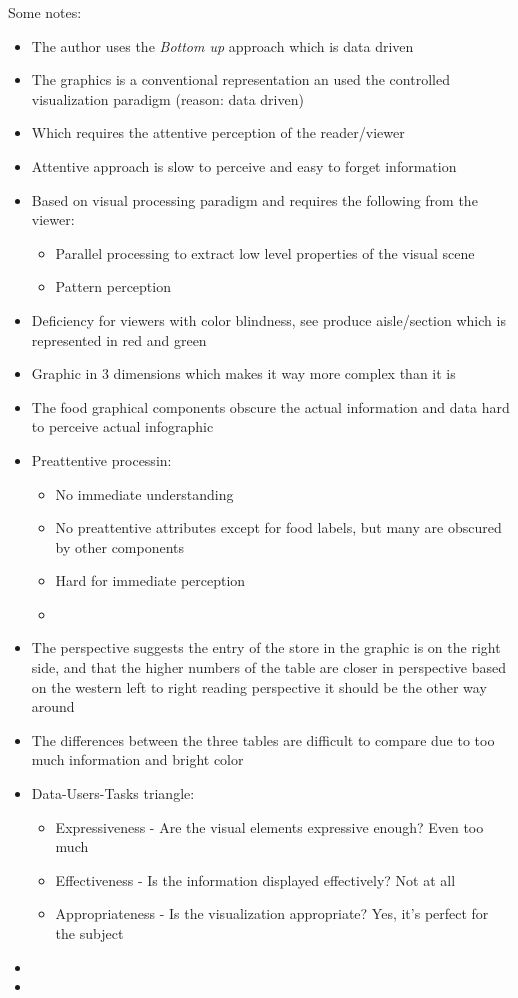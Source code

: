 \documentclass{article}
\begin{document}
Some notes:
\begin{itemize}
    \item The author uses the \textit{Bottom up} approach which is data driven
    \item The graphics is a conventional representation an used the controlled visualization paradigm (reason: data driven)
    \item Which requires the attentive perception of the reader/viewer
    \item Attentive approach is slow to perceive and easy to forget information
    \item Based on visual processing paradigm and requires the following from the viewer:
    \begin{itemize}
        \item Parallel processing to extract low level properties of the visual scene
        \item Pattern perception
    \end{itemize}
    \item Deficiency for viewers with color blindness, see produce aisle/section which is represented in red and green
    \item Graphic in 3 dimensions which makes it way more complex than it is
    \item The food graphical components obscure the actual information and data \rightarrow hard to perceive actual infographic
    \item Preattentive processin:
    \begin{itemize}
        \item No immediate understanding
        \item No preattentive attributes except for food labels, but many are obscured by other components
        \item Hard for immediate perception
        \item 
    \end{itemize}
    \item The perspective suggests the entry of the store in the graphic is on the right side, and that the higher numbers of the table are closer in perspective \rightarrow based on the western left to right reading perspective it should be the other way around
    \item The differences between the three tables are difficult to compare due to too much information and bright color
    \item Data-Users-Tasks triangle:
    \begin{itemize}
        \item Expressiveness - Are the visual elements expressive enough? \rightarrow Even too much
        \item Effectiveness - Is the information displayed effectively? \rightarrow Not at all
        \item Appropriateness - Is the visualization appropriate? \rightarrow Yes, it's perfect for the subject
    \end{itemize}
    \item 
    \item 
\end{itemize}
\end{document}
